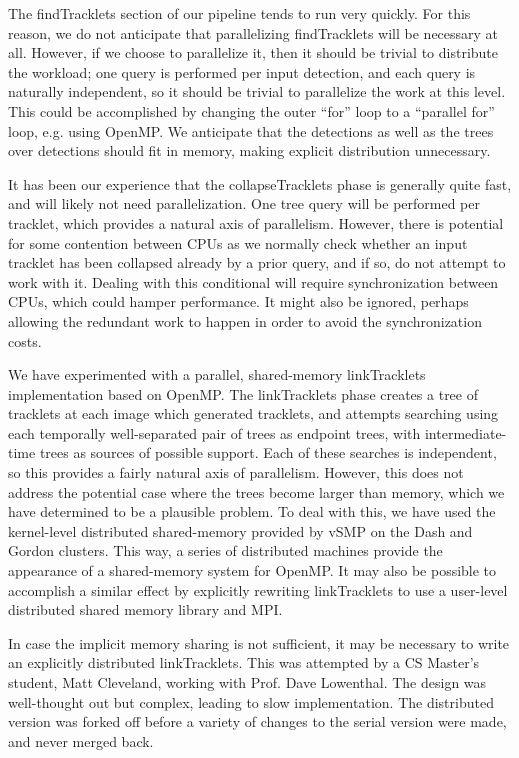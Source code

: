  The findTracklets section of
our pipeline tends to run very quickly.  For this reason, we do not
anticipate that parallelizing findTracklets will be necessary at all.
However, if we choose to parallelize it, then it should be trivial to
distribute the workload; one query is performed per input detection,
and each query is naturally independent, so it should be trivial to
parallelize the work at this level.  This could be accomplished by
changing the outer ``for'' loop to a ``parallel for'' loop, e.g. using
OpenMP.  We anticipate that the detections as well as the trees over
detections should fit in memory, making explicit distribution
unnecessary.

 It has been our
experience that the collapseTracklets phase is generally quite fast,
and will likely not need parallelization.  One tree query will be
performed per tracklet, which provides a natural axis of parallelism.
However, there is potential for some contention between CPUs as we
normally check whether an input tracklet has been collapsed already by
a prior query, and if so, do not attempt to work with it.  Dealing
with this conditional will require synchronization between CPUs, which
could hamper performance.  It might also be ignored, perhaps allowing
the redundant work to happen in order to avoid the synchronization
costs.

 We have experimented with a
parallel, shared-memory linkTracklets implementation based on OpenMP.
The linkTracklets phase creates a tree of tracklets at each image
which generated tracklets, and attempts searching using each
temporally well-separated pair of trees as endpoint trees, with
intermediate-time trees as sources of possible support.  Each of these
searches is independent, so this provides a fairly natural axis of
parallelism.  However, this does not address the potential case where
the trees become larger than memory, which we have determined to be a
plausible problem.  To deal with this, we have used the kernel-level
distributed shared-memory provided by vSMP on the Dash and Gordon
clusters.  This way, a series of distributed machines provide the
appearance of a shared-memory system for OpenMP.  It may also be
possible to accomplish a similar effect by explicitly rewriting
linkTracklets to use a user-level distributed shared memory library
and MPI.  

 In case the implicit
memory sharing is not sufficient, it may be necessary to write an
explicitly distributed linkTracklets.  This was attempted by a CS
Master's student, Matt Cleveland, working with Prof. Dave Lowenthal.
The design was well-thought out but complex, leading to slow
implementation.  The distributed version was forked off before a
variety of changes to the serial version were made, and never merged
back.

